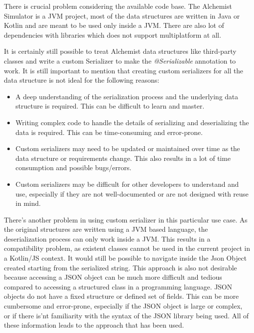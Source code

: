 

There is crucial problem considering the available code base.
The Alchemist Simulator is a JVM project, most of the data structures are written in Java or Kotlin and are meant to be used only inside a JVM. There are also lot of dependencies with libraries which does not support multiplatform at all.\newline

\noindent It is certainly still possible to treat Alchemist data structures like third-party classes and write a custom Serializer to make the \textit{@Serializable} annotation to work.
It is still important to mention that creating custom serializers for all the data structure is not ideal for the following reasons:
\begin{itemize}
	\item A deep understanding of the serialization process and the underlying data structure is required. This can be difficult to learn and master.
	\item Writing complex code to handle the details of serializing and deserializing the data is required. This can be time-consuming and error-prone.
	\item Custom serializers may need to be updated or maintained over time as the data structure or requirements change. This also results in a lot of time consumption and possible bugs/errors.
	\item Custom serializers may be difficult for other developers to understand and use, especially if they are not well-documented or are not designed with reuse in mind.
\end{itemize}

There's another problem in using custom serializer in this particular use case. As the original structures are written using a JVM based language, the deserialization process can only work inside a JVM. This results in a compatibility problem, as existent classes cannot be used in the current project in a Kotlin/JS context.
It would still be possible to navigate inside the Json Object created starting from the serialized string. This approach is also not desirable because accessing a JSON object can be much more difficult and tedious compared to accessing a structured class in a programming language.
JSON objects do not have a fixed structure or defined set of fields. This can be more cumbersome and error-prone, especially if the JSON object is large or complex, or if there is'nt familiarity with the syntax of the JSON library being used. All of these information leads to the approach that has been used.

